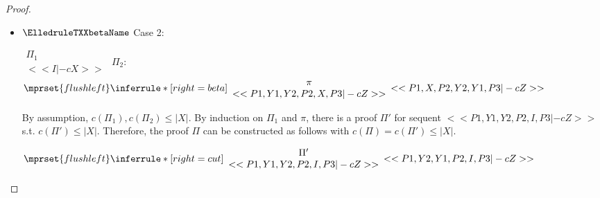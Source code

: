\begin{proof}
\begin{enumerate}
\begin{itemize}
    \item $\ElledruleTXXbetaName$ Case 2:
      \begin{center}
        \scriptsize
        \begin{math}
          \begin{array}{c}
            \Pi_1 \\
            {<<I |-c X>>}
          \end{array}
        \end{math}
        \qquad\qquad
        $\Pi_2$:
        \begin{math}
          $$\mprset{flushleft}
          \inferrule* [right={\tiny beta}] {
            {
              \begin{array}{c}
                \pi \\
                {<<P1, Y1, Y2, P2, X, P3 |-c Z>>}
              \end{array}
            }
          }{<<P1, X, P2, Y2, Y1, P3 |-c Z>>}
        \end{math}
      \end{center}
      By assumption, $c(\Pi_1),c(\Pi_2)\leq |X|$. By induction on $\Pi_1$ and $\pi$, there is
      a proof $\Pi'$ for sequent $<<P1, Y1, Y2, P2, I, P3 |-c Z>>$ s.t. $c(\Pi') \leq |X|$.
      Therefore, the proof $\Pi$ can be constructed as follows with
      $c(\Pi) = c(\Pi') \leq |X|$.
      \begin{center}
        \scriptsize
        \begin{math}
          $$\mprset{flushleft}
          \inferrule* [right={\tiny cut}] {
            {
              \begin{array}{cc}
                \Pi' \\
                {<<P1, Y1, Y2, P2, I, P3 |-c Z>>}
              \end{array}
            }
          }{<<P1, Y2, Y1, P2, I, P3 |-c Z>>}
        \end{math}
      \end{center}


\end{itemize}
\end{enumerate}
\end{proof}
